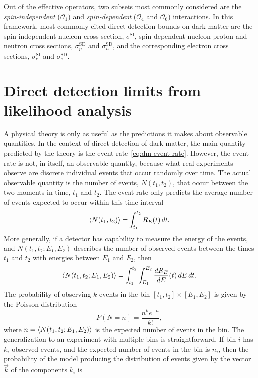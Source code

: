 Out of the effective operators, two subsets most commonly considered are the \emph{spin-independent} ($\mathcal{O_1}$) and \emph{spin-dependent} ($\mathcal{O}_4$ and $\mathcal{O}_6$) interactions. In this framework, most commonly cited direct detection bounds on dark matter are the spin-independent nucleon cross section, $\sigma^\text{SI}$, spin-dependent nucleon proton and neutron cross sections, $\sigma_p^\text{SD}$ and $\sigma_n^\text{SD}$, and the corresponding electron cross sections, $\sigma_e^\text{SI}$ and $\sigma_e^\text{SD}$.

\section{Direct detection limits from likelihood analysis}

A physical theory is only as useful as the predictions it makes about observable quantities. In the context of direct detection of dark matter, the main quantity predicted by the theory is the event rate~\eqref{eq:dm-event-rate}. However, the event rate is not, in itself, an observable quantity, because what real experiments observe are discrete individual events that occur randomly over time. The actual observable quantity is the number of events, $N(t_1,t_2)$, that occur between the two moments in time, $t_1$ and $t_2$. The event rate only predicts the average number of events expected to occur within this time interval
\begin{equation}
    \left\langle N(t_1,t_2)\right\rangle=\int_{t_1}^{t_2}R_E(t)\,d t.
\end{equation}
More generally, if a detector has capability to measure the energy of the events, and $N(t_1,t_2;E_1,E_2)$ describes the number of observed events between the times $t_1$ and $t_2$ with energies between $E_1$ and $E_2$, then
\begin{equation}
    \left\langle N(t_1,t_2;E_1,E_2)\right\rangle=\int_{t_1}^{t_2}\int_{E_1}^{E_2}\frac{dR_E}{dE}(t)\,d E\,d t.
\end{equation}
The probability of observing $k$ events in the bin $[t_1,t_2]\times[E_1,E_2]$ is given by the Poisson distribution
\begin{equation}
    P(N=n)=\frac{n^ke^{-n}}{k!},
\end{equation}
where $n=\left\langle N(t_1,t_2;E_1,E_2)\right\rangle$ is the expected number of events in the bin. The generalization to an experiment with multiple bins is straightforward. If bin $i$ has $k_i$ observed events, and the expected number of events in the bin is $n_i$, then the probability of the model producing the distribution of events given by the vector $\vec{k}$ of the components $k_i$ is
